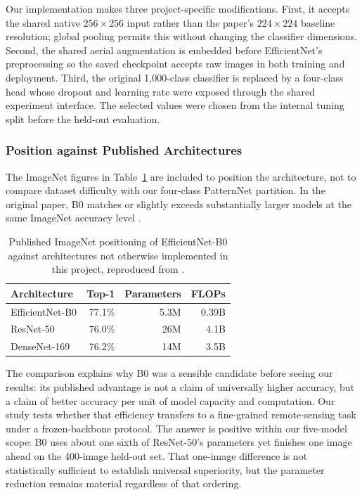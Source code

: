 \documentclass[11pt,twoside,a4paper]{article}
\begin{document}
Our implementation makes three project-specific modifications. First, it
accepts the shared native $256\times256$ input rather than the paper's
$224\times224$ baseline resolution; global pooling permits this without
changing the classifier dimensions. Second, the shared aerial augmentation is
embedded before EfficientNet's preprocessing so the saved checkpoint accepts
raw images in both training and deployment. Third, the original 1,000-class
classifier is replaced by a four-class head whose dropout and learning rate
were exposed through the shared experiment interface. The selected values were
chosen from the internal tuning split before the held-out evaluation.

\subsubsection{Position against Published Architectures}

The ImageNet figures in Table~\ref{tab:efficientnet-paper} are included to
position the architecture, not to compare dataset difficulty with our
four-class PatternNet partition. In the original paper, B0 matches or slightly
exceeds substantially larger models at the same ImageNet accuracy level
\cite{Tan2019}.

\begin{table}[H]
\centering
\caption{Published ImageNet positioning of EfficientNet-B0 against architectures
not otherwise implemented in this project, reproduced from \cite{Tan2019}.}
\label{tab:efficientnet-paper}
\small
\begin{tabular}{lrrr}
\toprule
Architecture & Top-1 & Parameters & FLOPs \\
\midrule
EfficientNet-B0 & 77.1\% & 5.3M & 0.39B \\
ResNet-50       & 76.0\% & 26M  & 4.1B \\
DenseNet-169    & 76.2\% & 14M  & 3.5B \\
\bottomrule
\end{tabular}
\end{table}

The comparison explains why B0 was a sensible candidate before seeing our
results: its published advantage is not a claim of universally higher
accuracy, but a claim of better accuracy per unit of model capacity and
computation. Our study tests whether that efficiency transfers to a
fine-grained remote-sensing task under a frozen-backbone protocol. The answer is
positive within our five-model scope: B0 uses about one sixth of ResNet-50's
parameters yet finishes one image ahead on the 400-image held-out set. That
one-image difference is not statistically sufficient to establish universal
superiority, but the parameter reduction remains material regardless of that
ordering.
\end{document}
